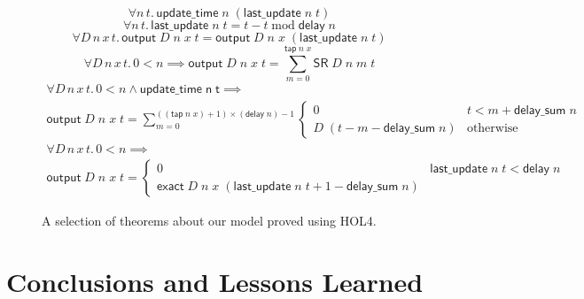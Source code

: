 \documentclass{llncs}
\begin{document}
\begin{figure}
\caption{
A selection of theorems about our model proved using HOL4.
\label{fig:theorems}
}
\begin{equation}\label{update_time_last_update}
\forall{n\,t}.\,\mathsf{update\_time}\;n\;(\mathsf{last\_update}\;n\;t)
\end{equation}
\begin{equation}\label{last_update_thm}
\forall{n\,t}.\,\mathsf{last\_update}\;n\;t=t-t\operatorname{mod}\mathsf{delay}\;n
\end{equation}
\begin{equation}\label{output_last_update}
\forall{D\,n\,x\,t}.\,\mathsf{output}\;D\;n\;x\;t=\mathsf{output}\;D\;n\;x\;(\mathsf{last\_update}\;n\;t)
\end{equation}
\begin{equation}\label{output_sum}
\forall{D\,n\,x\,t}.\,{0<n}\implies\mathsf{output}\;D\;n\;x\;t=\sum_{m=0}^{\mathsf{tap}\;n\;x}\mathsf{SR}\;D\;n\;m\;t
\end{equation}
\begin{multline}\label{output_input_at_update_times}
\forall{D\,n\,x\,t}.\,{0 < n}\land{\mathsf{update\_time\;n\;t}}\implies\\\mathsf{output}\;D\;n\;x\;t=\sum_{m=0}^{((\mathsf{tap}\;n\;x)+1)\times(\mathsf{delay}\;n)-1}\begin{cases}0&t<m+\mathsf{delay\_sum}\;n\\D\;(t-m-\mathsf{delay\_sum}\;n)&\text{otherwise}\end{cases}
\end{multline}
\begin{multline}\label{output_eq_exact}
\forall{D\,n\,x\,t}.\,{0 < n}\implies\\\mathsf{output}\;D\;n\;x\;t=\begin{cases}0&\mathsf{last\_update}\;n\;t<\mathsf{delay}\;n\\\mathsf{exact}\;D\;n\;x\;(\mathsf{last\_update}\;n\;t+1-\mathsf{delay\_sum}\;n)\end{cases}
\end{multline}
\end{figure}

\section{Conclusions and Lessons Learned}
\label{sec-conclusions}




\end{document}
